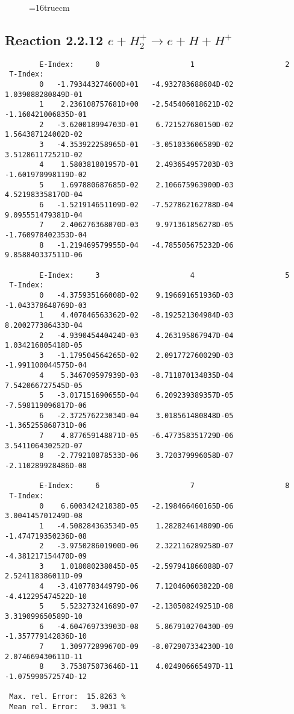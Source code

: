 \documentclass[12pt]{article}
\begin{document}
\begin{figure} \label{2.2.11}
\epsfxsize=16truecm
\end{figure}
\newpage




\subsection{
Reaction 2.2.12 $  e + H_2^+   \rightarrow  e + H + H^+  $
}



\begin{small}\begin{verbatim}
        E-Index:     0                     1                     2
 T-Index:
        0   -1.793443274600D+01   -4.932783688604D-02    1.039088280849D-01
        1    2.236108757681D+00   -2.545406018621D-02   -1.160421006835D-01
        2   -3.620018994703D-01    6.721527680150D-02    1.564387124002D-02
        3   -4.353922258965D-01   -3.051033606589D-02    3.512861172521D-02
        4    1.580381801957D-01    2.493654957203D-03   -1.601970998119D-02
        5    1.697880687685D-02    2.106675963900D-03    4.521983358170D-04
        6   -1.521914651109D-02   -7.527862162788D-04    9.095551479381D-04
        7    2.406276368070D-03    9.971361856278D-05   -1.760978402353D-04
        8   -1.219469579955D-04   -4.785505675232D-06    9.858840337511D-06

        E-Index:     3                     4                     5
 T-Index:
        0   -4.375935166008D-02    9.196691651936D-03   -1.043378648769D-03
        1    4.407846563362D-02   -8.192521304984D-03    8.200277386433D-04
        2   -4.939045440424D-03    4.263195867947D-04    1.034216805418D-05
        3   -1.179504564265D-02    2.091772760029D-03   -1.991100044575D-04
        4    5.346709597939D-03   -8.711870134835D-04    7.542066727545D-05
        5   -3.017151690655D-04    6.209239389357D-05   -7.598119096817D-06
        6   -2.372576223034D-04    3.018561480848D-05   -1.365255868731D-06
        7    4.877659148871D-05   -6.477358351729D-06    3.541106430252D-07
        8   -2.779210878533D-06    3.720379996058D-07   -2.110289928486D-08

        E-Index:     6                     7                     8
 T-Index:
        0    6.600342421838D-05   -2.198466460165D-06    3.004145701249D-08
        1   -4.508284363534D-05    1.282824614809D-06   -1.474719350236D-08
        2   -3.975028601900D-06    2.322116289258D-07   -4.381217154470D-09
        3    1.018080238045D-05   -2.597941866088D-07    2.524118386011D-09
        4   -3.410778344979D-06    7.120460603822D-08   -4.412295474522D-10
        5    5.523273241689D-07   -2.130508249251D-08    3.319099650589D-10
        6   -4.604769733903D-08    5.867910270430D-09   -1.357779142836D-10
        7    1.309772899670D-09   -8.072907334230D-10    2.074669430611D-11
        8    3.753875073646D-11    4.024906665497D-11   -1.075990572574D-12

 Max. rel. Error:  15.8263 %
 Mean rel. Error:   3.9031 %

\end{verbatim}\end{small}
\end{document}
